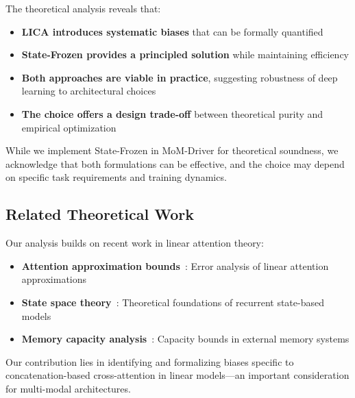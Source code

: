 The theoretical analysis reveals that:

\begin{itemize}
    \item \textbf{LICA introduces systematic biases} that can be formally quantified
    \item \textbf{State-Frozen provides a principled solution} while maintaining efficiency
    \item \textbf{Both approaches are viable in practice}, suggesting robustness of deep learning to architectural choices
    \item \textbf{The choice offers a design trade-off} between theoretical purity and empirical optimization
\end{itemize}

While we implement State-Frozen in MoM-Driver for theoretical soundness, we acknowledge that both formulations can be effective, and the choice may depend on specific task requirements and training dynamics.

\subsection{Related Theoretical Work}

Our analysis builds on recent work in linear attention theory:
\begin{itemize}
    \item \textbf{Attention approximation bounds}~\cite{linear_transformer}: Error analysis of linear attention approximations
    \item \textbf{State space theory}~\cite{s4}: Theoretical foundations of recurrent state-based models
    \item \textbf{Memory capacity analysis}~\cite{memory_networks}: Capacity bounds in external memory systems
\end{itemize}

Our contribution lies in identifying and formalizing biases specific to concatenation-based cross-attention in linear models—an important consideration for multi-modal architectures.